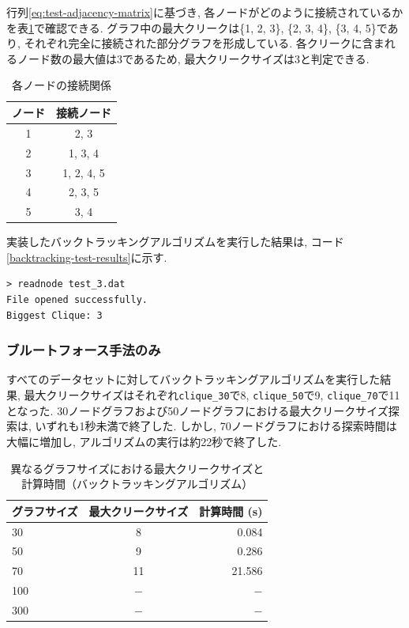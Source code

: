 \documentclass[a4j, 12pt]{jarticle}
\begin{document}
行列\ref{eq:test-adjacency-matrix}に基づき, 各ノードがどのように接続されているかを表\ref{table:matrix-connections}で確認できる. グラフ中の最大クリークは\{1, 2, 3\}, \{2, 3, 4\}, \{3, 4, 5\}であり, それぞれ完全に接続された部分グラフを形成している. 各クリークに含まれるノード数の最大値は3であるため, 最大クリークサイズは3と判定できる.
\begin{table}[H]
\centering
\caption{各ノードの接続関係}\label{table:matrix-connections}
\begin{tabular}{c|c}
\hline
\textbf{ノード} & \textbf{接続ノード} \\
\hline
1 & 2, 3 \\
2 & 1, 3, 4 \\
3 & 1, 2, 4, 5 \\
4 & 2, 3, 5 \\
5 & 3, 4 \\
\hline
\end{tabular}
\end{table}


実装したバックトラッキングアルゴリズムを実行した結果は, コード\ref{backtracking-test-results}に示す.
\begin{lstlisting}[caption={模擬グラフの実験結果.}, label=backtracking-test-results]
> readnode test_3.dat
File opened successfully.
Biggest Clique: 3
\end{lstlisting}
\subsubsection{ブルートフォース手法のみ}
すべてのデータセットに対してバックトラッキングアルゴリズムを実行した結果, 最大クリークサイズはそれぞれ\texttt{clique\_30}で8, \texttt{clique\_50}で9, \texttt{clique\_70}で11となった. 30ノードグラフおよび50ノードグラフにおける最大クリークサイズ探索は, いずれも1秒未満で終了した. しかし, 70ノードグラフにおける探索時間は大幅に増加し, アルゴリズムの実行は約22秒で終了した. 
\begin{table}[H]
\centering
\caption{異なるグラフサイズにおける最大クリークサイズと計算時間（バックトラッキングアルゴリズム）}\label{tab:backtracking-only-results}
\begin{tabular}{l|c|r}
\hline
\textbf{グラフサイズ} & \textbf{最大クリークサイズ} & \textbf{計算時間 (s)} \\
\hline
30  & 8  & 0.084 \\
50  & 9  & 0.286 \\
70  & 11 & 21.586 \\
100 & $-$  & $-$ \\
300 & $-$  & $-$ \\
\hline
\end{tabular}
\end{table}
\end{document}
